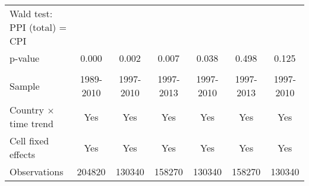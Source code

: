 {\begin{tabular}{l*{6}{c}}
Wald test: PPI (total) = CPI&                     &                     &                     &                     &                     &                     \\
\hspace{15pt} p-value&       0.000         &       0.002         &       0.007         &       0.038         &       0.498         &       0.125         \\
\hline \\ Sample    &   1989-2010         &   1997-2010         &   1997-2013         &   1997-2010         &   1997-2013         &   1997-2010         \\
Country $\times$ time trend&         Yes         &         Yes         &         Yes         &         Yes         &         Yes         &         Yes         \\
Cell fixed effects  &         Yes         &         Yes         &         Yes         &         Yes         &         Yes         &         Yes         \\
Observations        &      204820         &      130340         &      158270         &      130340         &      158270         &      130340         \\
\hline\hline
\end{tabular}
}
